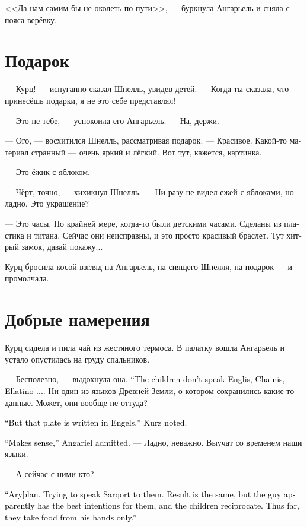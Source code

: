 \documentclass[a4paper,12pt,fleqn]{book}\usepackage{cooltooltips}\usepackage{polyglossia}\setdefaultlanguage[babelshorthands=true]{russian}\setotherlanguage{english}\defaultfontfeatures{Ligatures=TeX,Mapping=tex-text} \usepackage{xcolor}\definecolor{lightgray}{HTML}{bbbbbb}\color{lightgray}\newcommand{\ml}[3]{\textenglish{\textcolor{black}{#3}}}
\newcommand{\Arythlan}{Aryþlan}
\begin{document}
<<Да нам самим бы не околеть по пути>>, --- буркнула Ангарьель и сняла с пояса верёвку.

\section{Подарок}

--- Курц! --- испуганно сказал Шнелль, увидев детей.
--- Когда ты сказала, что принесёшь подарки, я не это себе представлял!

--- Это не тебе, --- успокоила его Ангарьель.
--- На, держи.

--- Ого, --- восхитился Шнелль, рассматривая подарок.
--- Красивое.
Какой-то материал странный --- очень яркий и лёгкий.
Вот тут, кажется, картинка.

--- Это ёжик с яблоком.

--- Чёрт, точно, --- хихикнул Шнелль.
--- Ни разу не видел ежей с яблоками, но ладно.
Это украшение?

--- Это часы.
По крайней мере, когда-то были детскими часами.
Сделаны из пластика и титана.
Сейчас они неисправны, и это просто красивый браслет.
Тут хитрый замок, давай покажу...

Курц бросила косой взгляд на Ангарьель, на сиящего Шнелля, на подарок --- и промолчала.

\section{Добрые намерения}

Курц сидела и пила чай из жестяного термоса.
В палатку вошла Ангарьель и устало опустилась на груду спальников.

--- Бесполезно, --- выдохнула она.
\ml{$0$}
{--- Детишки не понимают англисский, чайнис, эллатино...}
{``The children don't speak Englis, Chainis, Ellatino ....}
Ни один из языков Древней Земли, о котором сохранились какие-то данные.
Может, они вообще не оттуда?

\ml{$0$}
{--- Но табличка-то на ангельском, --- заметила Курц.}
{``But that plate is written in Engels,'' Kurz noted.}

\ml{$0$}
{--- Разумно, --- признала Ангарьель.}
{``Makes sense,'' Angariel admitted.}
--- Ладно, неважно.
Выучат со временем наши языки.

--- А сейчас с ними кто?

\ml{$0$}
{--- Арслан.}
{``\Arythlan.}
\ml{$0$}
{Пытается разговаривать на саркорте.}
{Trying to speak Sarqort to them.}
\ml{$0$}
{Тоже безрезультатно, но у парня явно самые добрые намерения, и дети к нему тянутся.}
{Result is the same, but the guy apparently has the best intentions for them, and the children reciprocate.}
\ml{$0$}
{Едят пока что только из его рук.}
{Thus far, they take food from his hands only.''}
\end{document}
